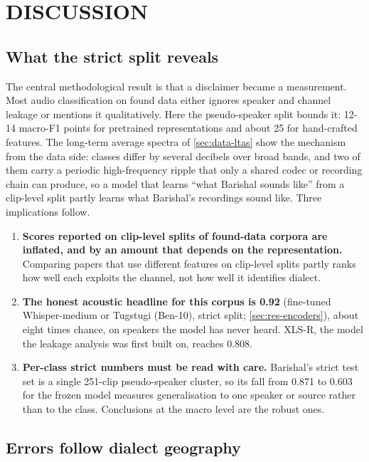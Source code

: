 \chapter{DISCUSSION}
\label{ch:discussion}

\section{What the strict split reveals}
\label{sec:disc-strict}

The central methodological result is that a disclaimer became a measurement.
Most audio classification on found data either ignores speaker and channel
leakage or mentions it qualitatively. Here the pseudo-speaker split bounds it:
12-14 macro-F1 points for pretrained representations and about 25 for
hand-crafted features. The long-term average spectra of \cref{sec:data-ltas}
show the mechanism from the data side: classes differ by several decibels over
broad bands, and two of them carry a periodic high-frequency ripple that only a
shared codec or recording chain can produce, so a model that learns ``what
Barishal sounds like'' from a clip-level split partly learns what Barishal's
recordings sound like. Three implications follow.

\begin{enumerate}
  \item \textbf{Scores reported on clip-level splits of found-data corpora are
        inflated, and by an amount that depends on the representation.}
        Comparing papers that use different features on clip-level splits
        partly ranks how well each exploits the channel, not how well it
        identifies dialect.
  \item \textbf{The honest acoustic headline for this corpus is 0.92}
        (fine-tuned Whisper-medium or Tugstugi (Ben-10), strict split;
        \cref{sec:res-encoders}), about eight times chance, on speakers the
        model has never heard. XLS-R, the model the leakage analysis was first
        built on, reaches 0.808.
  \item \textbf{Per-class strict numbers must be read with care.} Barishal's
        strict test set is a single 251-clip pseudo-speaker cluster, so its fall
        from 0.871 to 0.603 for the frozen model measures generalisation to one
        speaker or source rather than to the class. Conclusions at the macro
        level are the robust ones.
\end{enumerate}

\section{Errors follow dialect geography}
\label{sec:disc-geography}

